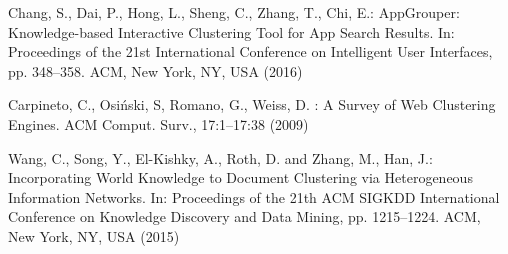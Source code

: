\documentclass[runningheads]{llncs}
\begin{document}
\begin{thebibliography}{8}
Chang, S., Dai, P., Hong, L., Sheng, C., Zhang, T., Chi, E.: AppGrouper: Knowledge-based Interactive Clustering Tool for App Search Results. In: Proceedings of the 21st International Conference on Intelligent User Interfaces, pp. 348--358. ACM, New York, NY, USA (2016) 

Carpineto, C., Osi\'{n}ski, S, Romano, G., Weiss, D. : A Survey of Web Clustering Engines. ACM Comput. Surv., 17:1--17:38 (2009)

Wang, C., Song, Y., El-Kishky, A., Roth, D. and Zhang, M., Han, J.: Incorporating World Knowledge to Document Clustering via Heterogeneous Information Networks. In: Proceedings of the 21th ACM SIGKDD International Conference on Knowledge Discovery and Data Mining, pp. 1215--1224. ACM, New York, NY, USA (2015)


\end{thebibliography}

\end{document}
